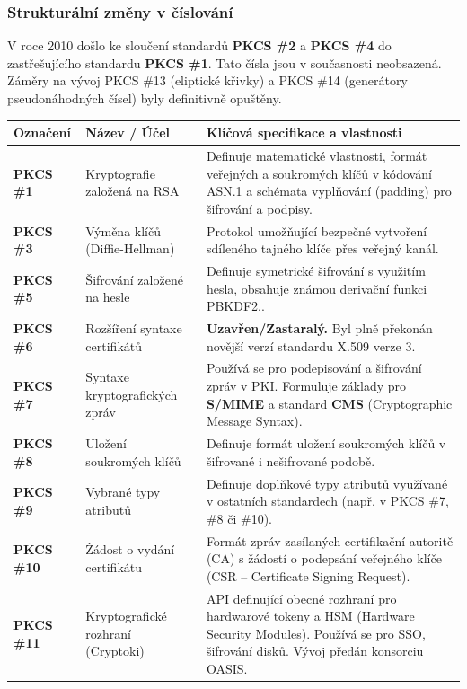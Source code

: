 \documentclass[10pt,a4paper]{article}
\begin{document}
	
	\subsubsection*{Strukturální změny v číslování}
	V roce 2010 došlo ke sloučení standardů \textbf{PKCS \#2} a \textbf{PKCS \#4} do zastřešujícího standardu \textbf{PKCS \#1}. Tato čísla jsou v současnosti neobsazená. Záměry na vývoj PKCS \#13 (eliptické křivky) a PKCS \#14 (generátory pseudonáhodných čísel) byly definitivně opuštěny.

	
	\begin{center}
		\small
		\begin{tabular}{|l|p{4.5cm}|p{9.0cm}|}
			\hline
			\textbf{Označení} & \textbf{Název / Účel} & \textbf{Klíčová specifikace a vlastnosti} \\ \hline
			\textbf{PKCS \#1} & Kryptografie založená na RSA & Definuje matematické vlastnosti, formát veřejných a soukromých klíčů v kódování ASN.1 a schémata vyplňování (padding) pro šifrování a podpisy. \\ \hline
			\textbf{PKCS \#3} & Výměna klíčů (Diffie-Hellman) & Protokol umožňující bezpečné vytvoření sdíleného tajného klíče přes veřejný kanál. \\ \hline
			\textbf{PKCS \#5} & Šifrování založené na hesle & Definuje symetrické šifrování s využitím hesla, obsahuje známou derivační funkci PBKDF2.. \\ \hline
			\textbf{PKCS \#6} & Rozšíření syntaxe certifikátů & \textbf{Uzavřen/Zastaralý.} Byl plně překonán novější verzí standardu X.509 verze 3. \\ \hline
			\textbf{PKCS \#7} & Syntaxe kryptografických zpráv & Používá se pro podepisování a šifrování zpráv v PKI. Formuluje základy pro \textbf{S/MIME} a standard \textbf{CMS} (Cryptographic Message Syntax).\\ \hline
			\textbf{PKCS \#8} & Uložení soukromých klíčů & Definuje formát uložení soukromých klíčů v šifrované i nešifrované podobě. \\ \hline
			\textbf{PKCS \#9} & Vybrané typy atributů & Definuje doplňkové typy atributů využívané v ostatních standardech (např. v PKCS \#7, \#8 či \#10). \\ \hline
			\textbf{PKCS \#10} & Žádost o vydání certifikátu & Formát zpráv zasílaných certifikační autoritě (CA) s žádostí o podepsání veřejného klíče (CSR – Certificate Signing Request). \\ \hline
			\textbf{PKCS \#11} & Kryptografické rozhraní (Cryptoki) & API definující obecné rozhraní pro hardwarové tokeny a HSM (Hardware Security Modules). Používá se pro SSO, šifrování disků. Vývoj předán konsorciu OASIS. \\ \hline

\end{tabular}
\end{center}
\end{document}
